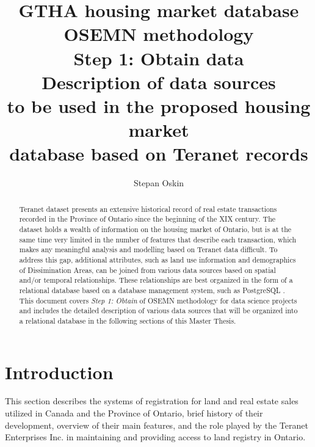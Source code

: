\documentclass[11pt]{article}
\begin{document}
    \title{GTHA housing market database \\
    OSEMN methodology \\
    Step 1: Obtain data \\
    Description of data sources \\
    to be used in the proposed housing market \\
    database based on Teranet records}

    \author{Stepan Oskin}

    \maketitle

    \begin{abstract}

        Teranet dataset presents an extensive historical record of real estate transactions recorded in the Province of Ontario since the beginning of the XIX century.
        The dataset holds a wealth of information on the housing market of Ontario, but is at the same time very limited in the number of features that describe each transaction, which makes any meaningful analysis and modelling based on Teranet data difficult.
        To address this gap, additional attributes, such as land use information and demographics of Dissimination Areas, can be joined from various data sources based on spatial and/or temporal relationships.
        These relationships are best organized in the form of a relational database based on a database management system, such as PostgreSQL .
        This document covers \textit{Step 1: Obtain} of OSEMN methodology for data science projects and includes the detailed description of various data sources that will be organized into a relational database in the following sections of this Master Thesis.

    \end{abstract}

    \section{Introduction} \label{sec:intro}

    This section describes the systems of registration for land and real estate sales utilized in Canada and the Province of Ontario, brief history of their development, overview of their main features, and the role played by the Teranet Enterprises Inc. in maintaining and providing access to land registry in Ontario.
\end{document}
